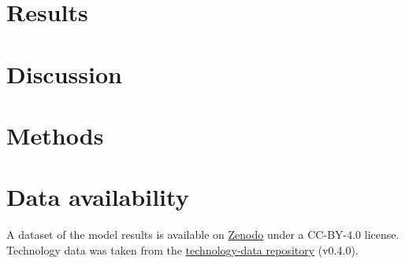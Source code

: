\documentclass[5p,numafflabel]{elsarticle}
\begin{document}
\section*{Results}
\label{sec:results}



\section*{Discussion}
\label{sec:discussion}



\label{sec:conclusion}



\section*{Methods}
\label{sec:methods}













\section*{Data availability}
A dataset of the model results is available on \href{https://doi.org/10.5281/zenodo.10951650}{Zenodo} under a CC-BY-4.0 license. 
Technology data was taken from the
\href{https://github.com/pypsa/technology-data}{technology-data repository} (v0.4.0).
\end{document}
